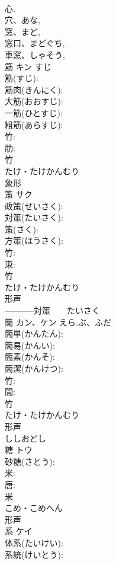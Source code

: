 \documentclass[8pt]{extreport}
\begin{document}
\begin{CJK}{UTF8}{min}
\\	心. 
\\	穴、あな, 
\\	窓、まど, 
\\	窓口、まどぐち, 
\\	車窓、しゃそう, 
\\	筋	キン	すじ		
\\	筋(すじ): 
\\	筋肉(きんにく): 
\\	大筋(おおすじ): 
\\	一筋(ひとすじ): 
\\	粗筋(あらすじ): 
\\	竹: 
\\	肋: 
\\	竹	
\\	たけ・たけかんむり	
\\	象形 
\\	策	サク			
\\	政策(せいさく): 
\\	対策(たいさく): 
\\	策(さく): 
\\	方策(ほうさく): 
\\	竹: 
\\	朿: 
\\	竹	
\\	たけ・たけかんむり	
\\	形声 
\\	-----------対策　　たいさく　　
\\	簡	カン、ケン	えら.ぶ、ふだ		
\\	簡単(かんたん): 
\\	簡易(かんい): 
\\	簡素(かんそ): 
\\	簡潔(かんけつ): 
\\	竹: 
\\	間: 
\\	竹	
\\	たけ・たけかんむり	
\\	形声 
\\	ししおどし 
\\	糖	トウ			
\\	砂糖(さとう): 
\\	米: 
\\	唐: 
\\	米	
\\	こめ・こめへん	
\\	形声 
\\	系	ケイ			
\\	体系(たいけい): 
\\	系統(けいとう): 

\end{CJK}
\end{document}
